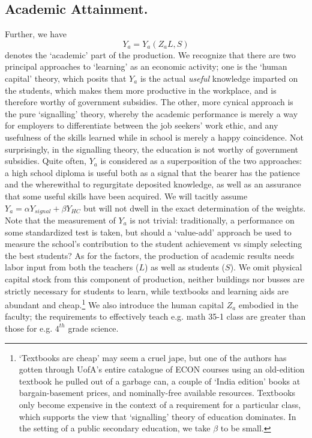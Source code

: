 \documentclass{homework}
\begin{document}
\subsection{Academic Attainment.} Further, we have \[Y_a = Y_a(Z_a L, S)\] denotes the `academic' part of the production. We recognize that there are two principal approaches to `learning' as an economic activity; one is the `human capital' theory, which posits that $Y_a$ is the actual \emph{useful} knowledge imparted on the students, which makes them more productive in the workplace, and is therefore worthy of government subsidies. The other, more cynical approach is the pure `signalling' theory, whereby the academic performance is merely a way for employers to differentiate between the job seekers' work ethic, and any usefulness of the skills learned while in school is merely a happy coincidence. Not surprisingly, in the signalling theory, the education is not worthy of government subsidies. Quite often, $Y_a$ is considered as a superposition of the two approaches: a high school diploma is useful both as a signal that the bearer has the patience and the wherewithal to regurgitate deposited knowledge, as well as an assurance that some useful skills have been acquired. We will tacitly assume $Y_a = \alpha Y_{signal} + \beta Y_{HC}$ but will not dwell in the exact determination of the weights.
Note that the measurement of $Y_a$ is not trivial: traditionally, a performance on some standardized test is taken, but should a `value-add' approach be used to measure the school's contribution to the student achievement vs simply selecting the best students?
As for the factors, the production of academic results needs labor input from both the teachers ($L$) as well as students ($S$). We omit physical capital stock from this component of production, neither buildings nor busses are strictly necessary for students to learn, while textbooks and learning aids are abundant and cheap.\footnote{`Textbooks are cheap' may seem a cruel jape, but one of the authors has gotten through UofA's entire catalogue of ECON courses using an old-edition textbook he pulled out of a garbage can, a couple of `India edition' books at bargain-basement prices, and nominally-free available resources. Textbooks only become expensive in the context of a requirement for a particular class, which supports the view that `signalling' theory of education dominates. In the setting of a public secondary education, we take $\beta$ to be small.} We also introduce the human capital $Z_a$ embodied in the faculty; the requirements to effectively teach e.g. math 35-1 class are greater than those for e.g. $4^{th}$ grade science.
\end{document}
